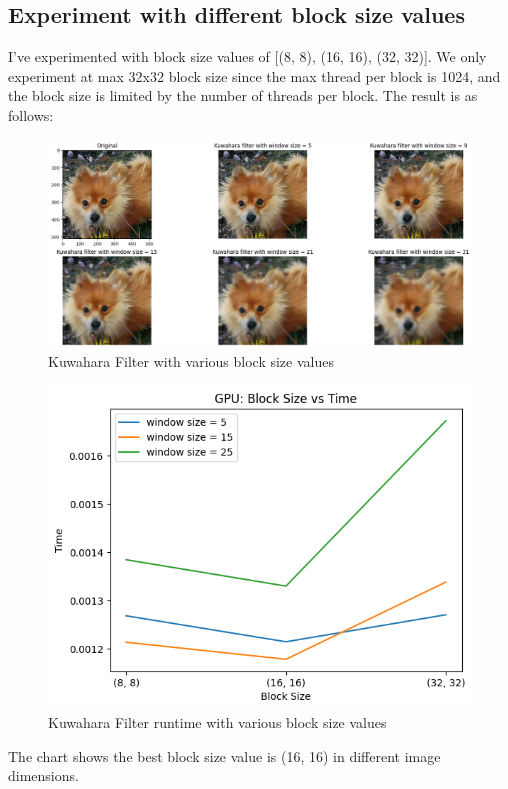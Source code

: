 \documentclass{article}
\begin{document}
\subsection{Experiment with different block size values}
I've experimented with block size values of [(8, 8), (16, 16), (32, 32)]. We only experiment at max 32x32 block size since the max thread per block is 1024, and the block size is limited by the number of threads per block.
The result is as follows:
\begin{figure}
    \centering
    \includegraphics[width=0.5\linewidth]{results/output.png}
    \caption{Kuwahara Filter with various block size values}
    \label{fig:enter-label}
\end{figure}
\begin{figure}
  \centering
  \includegraphics[width=0.5\linewidth]{results/gpu_blocksize_vs_time.png}
  \caption{Kuwahara Filter runtime with various block size values}
  \label{fig:enter-label}
\end{figure}
The chart shows the best block size value is (16, 16) in different image dimensions.
\end{document}
